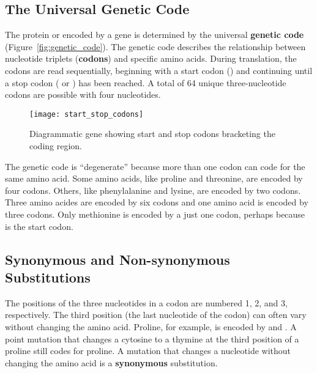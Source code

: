 \documentclass[letterpaper]{tufte-handout}
\begin{document}
\newpage

\subsection*{The Universal Genetic Code}

The protein or  encoded by a gene is determined by the universal \textbf{genetic code} (Figure~\ref{fig:genetic_code}). The genetic code describes the relationship between nucleotide triplets (\textbf{codons}) and specific amino acids. During translation, the codons are read  sequentially, beginning with a start codon () and continuing until a stop codon ( or ) has been reached. A total of 64 unique three-nucleotide codons are possible with four nucleotides.


\begin{figure}
\texttt{[image: start\_stop\_codons]}
\caption{Diagrammatic gene showing start and stop codons bracketing the coding region.}
\end{figure}

The genetic code is “degenerate” because more than one codon can code for the same amino acid. Some amino acids, like proline and threonine, are encoded by four codons. Others, like phenylalanine and lysine, are encoded by two codons. Three amino acides are encoded by six codons and one amino acid is encoded by three codons. Only methionine is encoded by a just one codon, perhaps because  is the start codon.


\subsection*{Synonymous and Non-synonymous Substitutions}

The positions of the three nucleotides in a codon are numbered 1, 2, and 3, respectively. The third position (the last nucleotide of the codon) can often vary without changing the amino acid. Proline, for example, is encoded by  and . A point mutation that changes a cytosine to a thymine at the third position of a proline still codes for proline. A mutation that changes a nucleotide without changing the amino acid is a \textbf{synonymous} substitution. 
\end{document}

